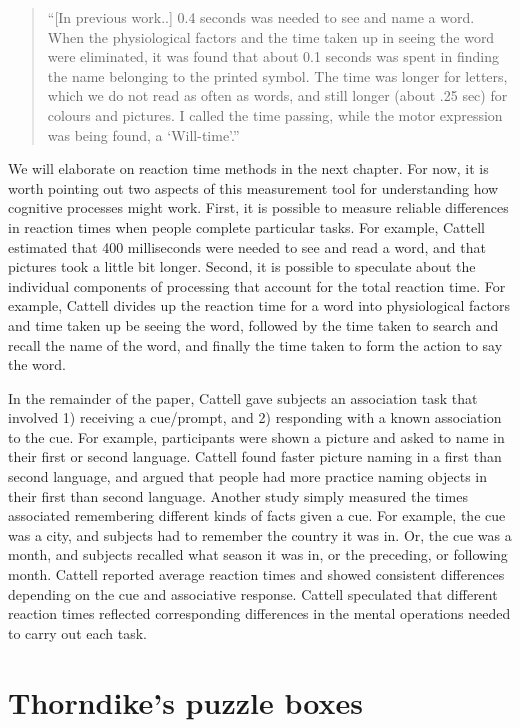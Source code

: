 \documentclass[
  oneside,
  12pt]{crumpbook}
\begin{document}
\begin{quote}
``{[}In previous work..{]} 0.4 seconds was needed to see and name a word. When the physiological factors and the time taken up in seeing the word were eliminated, it was found that about 0.1 seconds was spent in finding the name belonging to the printed symbol. The time was longer for letters, which we do not read as often as words, and still longer (about .25 sec) for colours and pictures. I called the time passing, while the motor expression was being found, a `Will-time'.''
\end{quote}

We will elaborate on reaction time methods in the next chapter. For now, it is worth pointing out two aspects of this measurement tool for understanding how cognitive processes might work. First, it is possible to measure reliable differences in reaction times when people complete particular tasks. For example, Cattell estimated that 400 milliseconds were needed to see and read a word, and that pictures took a little bit longer. Second, it is possible to speculate about the individual components of processing that account for the total reaction time. For example, Cattell divides up the reaction time for a word into physiological factors and time taken up be seeing the word, followed by the time taken to search and recall the name of the word, and finally the time taken to form the action to say the word.

In the remainder of the paper, Cattell gave subjects an association task that involved 1) receiving a cue/prompt, and 2) responding with a known association to the cue. For example, participants were shown a picture and asked to name in their first or second language. Cattell found faster picture naming in a first than second language, and argued that people had more practice naming objects in their first than second language. Another study simply measured the times associated remembering different kinds of facts given a cue. For example, the cue was a city, and subjects had to remember the country it was in. Or, the cue was a month, and subjects recalled what season it was in, or the preceding, or following month. Cattell reported average reaction times and showed consistent differences depending on the cue and associative response. Cattell speculated that different reaction times reflected corresponding differences in the mental operations needed to carry out each task.

\hypertarget{thorndikes-puzzle-boxes}{%
\section{Thorndike's puzzle boxes}\label{thorndikes-puzzle-boxes}}
\end{document}
